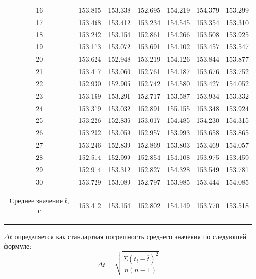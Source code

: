 \begin{center}
\begin{table}[H]
\centering
\renewcommand{\arraystretch}{1.15}
\begin{tabular}{|c|c|c|c|c|c|c|}
\hline
16 & 153.805 & 153.338 & 152.695 & 154.219 & 154.379 & 153.299 \\
17 & 153.468 & 153.412 & 153.234 & 154.545 & 153.354 & 153.310 \\
18 & 153.242 & 153.154 & 152.861 & 154.266 & 153.508 & 153.925 \\
19 & 153.173 & 153.072 & 153.691 & 154.102 & 153.457 & 153.547 \\
20 & 153.624 & 152.948 & 153.219 & 154.126 & 153.844 & 153.877 \\
21 & 153.417 & 153.060 & 152.761 & 154.187 & 153.676 & 153.752 \\
22 & 152.930 & 152.905 & 152.742 & 154.580 & 153.427 & 154.052 \\
23 & 153.169 & 153.291 & 152.717 & 153.587 & 153.934 & 153.332 \\
24 & 153.379 & 153.032 & 152.891 & 155.155 & 153.348 & 153.924 \\
25 & 153.226 & 152.836 & 153.017 & 154.485 & 154.230 & 154.315 \\
26 & 153.202 & 153.059 & 152.957 & 153.993 & 153.658 & 153.865 \\
27 & 153.246 & 152.839 & 152.869 & 153.803 & 153.469 & 154.057 \\
28 & 152.514 & 152.999 & 152.854 & 154.108 & 153.975 & 153.459 \\
29 & 152.914 & 153.312 & 152.827 & 154.328 & 153.549 & 153.781 \\
30 & 153.729 & 153.089 & 152.797 & 153.985 & 153.444 & 154.085 \\
\hline
\begin{minipage}{2cm}
\begin{center}
    Среднее значение $\overline{t}$, с
\end{center}
\end{minipage}
& 153.412 & 153.154 & 152.802 & 154.149 & 153.770 & 153.518 \\
\hline
\end{tabular}
\end{table}
\end{center}

$\Delta t$ определяется как стандартная погрешность среднего значения по следующей формуле:
\begin{equation}
\label{eq:11}
   \Delta\overline{t}=\sqrt{\frac{\Sigma(t_i-\overline{t})^2}{{n(n-1)}}}
\end{equation}

